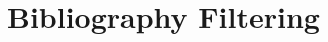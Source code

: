 \documentclass[a4paper,12pt]{report}
\begin{document}
\chapter{Bibliography Filtering}
\nocite{unreferenced_source}
\bibliographyChapter
\end{document}
